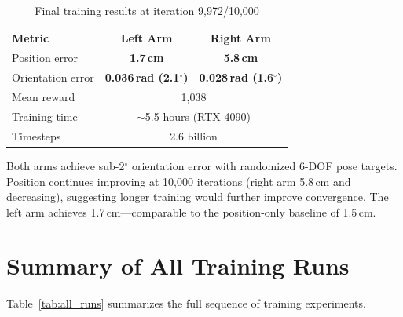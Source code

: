 \documentclass[11pt,a4paper]{article}
\begin{document}
\begin{table}[H]
\centering
\caption{Final training results at iteration 9,972/10,000}
\label{tab:final_results}
\begin{tabular}{@{}lcc@{}}
\toprule
\textbf{Metric} & \textbf{Left Arm} & \textbf{Right Arm} \\
\midrule
Position error & \textbf{1.7\,cm} & \textbf{5.8\,cm} \\
Orientation error & \textbf{0.036\,rad (2.1$^\circ$)} & \textbf{0.028\,rad (1.6$^\circ$)} \\
\midrule
Mean reward & \multicolumn{2}{c}{1,038} \\
Training time & \multicolumn{2}{c}{$\sim$5.5 hours (RTX 4090)} \\
Timesteps & \multicolumn{2}{c}{2.6 billion} \\
\bottomrule
\end{tabular}
\end{table}

\noindent Both arms achieve sub-2$^\circ$ orientation error with randomized 6-DOF pose targets. Position continues improving at 10,000 iterations (right arm 5.8\,cm and decreasing), suggesting longer training would further improve convergence. The left arm achieves 1.7\,cm---comparable to the position-only baseline of 1.5\,cm.

\section{Summary of All Training Runs}
\label{sec:all_runs}

Table~\ref{tab:all_runs} summarizes the full sequence of training experiments.
\end{document}
